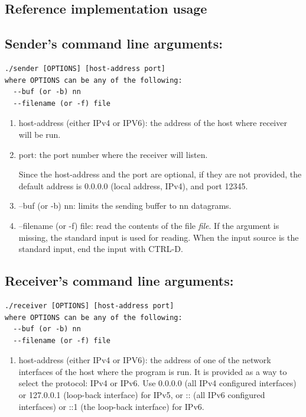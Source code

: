 \documentclass[12pt]{book}
\begin{document}
\begin{enumerate}[label=\arabic*.]
\chapter{Reference implementation usage}\label{proto-ref.se}

\section{Sender's command line arguments:}

\begin{verbatim}
./sender [OPTIONS] [host-address port]
where OPTIONS can be any of the following:
  --buf (or -b) nn
  --filename (or -f) file
\end{verbatim}

\begin{enumerate}
\item host-address (either IPv4 or IPV6): the address of the host where receiver will be run.
\item port: the port number where the receiver will listen.

  Since the host-address and the port are optional, if they are not provided, the default address is 0.0.0.0 (local address, IPv4), and port 12345.
\item --buf (or -b) nn: limits the sending buffer to nn datagrams.
  \item --filename (or -f) file: read the contents of the file \emph{file}. If the argument is missing, the standard input is used for reading. When the input source is the standard input, end the input with CTRL-D.
\end{enumerate}


\section{Receiver's command line arguments:}

\begin{verbatim}
./receiver [OPTIONS] [host-address port]
where OPTIONS can be any of the following:
  --buf (or -b) nn
  --filename (or -f) file
\end{verbatim}

\begin{enumerate}
\item host-address (either IPv4 or IPV6): the address of one of the network interfaces of the host where the program is run. It is provided as a way to select the protocol: IPv4 or IPv6. Use 0.0.0.0 (all IPv4 configured interfaces) or 127.0.0.1 (loop-back interface) for IPv5, or :: (all IPv6 configured interfaces) or ::1 (the loop-back interface) for IPv6.


\end{enumerate}
\end{enumerate}
\end{document}
